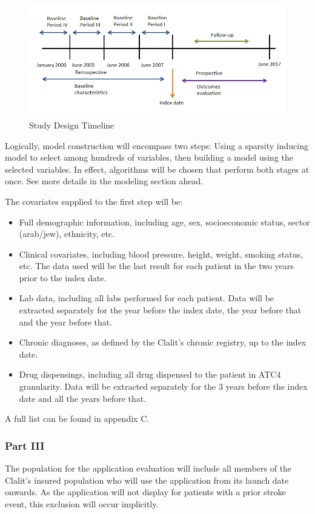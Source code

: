 \documentclass[a4paper,12pt]{article}
\begin{document}
		\begin{figure}[h]
			\centering
			\includegraphics[width=\textwidth]{prelim-results/Panpredictor/timeline.png}
			\caption{Study Design Timeline}
		\end{figure}
	
		Logically, model construction will encompass two steps: Using a sparsity inducing model to select among hundreds of variables, then building a model using the selected variables. In effect, algorithms will be chosen that perform both stages at once. See more details in the modeling section ahead.
		
		The covariates supplied to the first step will be: 
		\begin{itemize}
			\item Full demographic information, including age, sex, socioeconomic status, sector (arab/jew), ethnicity, etc.
			\item Clinical covariates, including blood pressure, height, weight, smoking status, etc. The data used will be the last result for each patient in the two years prior to the index date.
			\item Lab data, including all labs performed for each patient. Data will be extracted separately for the year before the index date, the year before that and the year before that.
			\item Chronic diagnoses, as defined by the Clalit's chronic registry\cite{Rennert2001}, up to the index date.
			\item Drug dispensings, including all drug dispensed to the patient in ATC4 granularity\cite{DrugStatisticsMethodology2010}. Data will be extracted separately for the 3 years before the index date and all the years before that.
		\end{itemize}
		A full list can be found in appendix C.
	
		\subsubsection{Part III}
		The population for the application evaluation will include all members of the Clalit's insured population who will use the application from its launch date onwards. As the application will not display for patients with a prior stroke event, this exclusion will occur implicitly.
		
\end{document}
